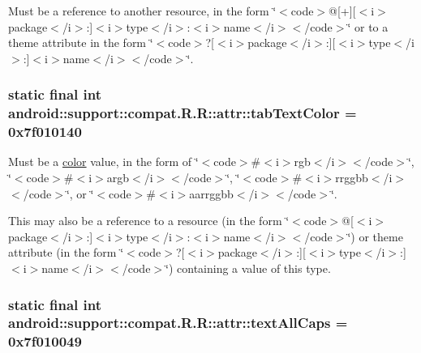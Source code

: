 Must be a reference to another resource, in the form \char`\"{}$<$code$>$@\mbox{[}+\mbox{]}\mbox{[}$<$i$>$package$<$/i$>$:\mbox{]}$<$i$>$type$<$/i$>$:$<$i$>$name$<$/i$>$$<$/code$>$\char`\"{} or to a theme attribute in the form \char`\"{}$<$code$>$?\mbox{[}$<$i$>$package$<$/i$>$:\mbox{]}\mbox{[}$<$i$>$type$<$/i$>$:\mbox{]}$<$i$>$name$<$/i$>$$<$/code$>$\char`\"{}. \hypertarget{classandroid_1_1support_1_1compat_1_1_r_1_1attr_183ac170e8f92fec45990e2cc7842bca}{
\subsubsection[{tabTextColor}]{\setlength{\rightskip}{0pt plus 5cm}static final int android::support::compat.R.R::attr::tabTextColor = 0x7f010140}}
\label{classandroid_1_1support_1_1compat_1_1_r_1_1attr_183ac170e8f92fec45990e2cc7842bca}


Must be a \hyperlink{classandroid_1_1support_1_1compat_1_1_r_1_1color}{color} value, in the form of \char`\"{}$<$code$>$\#$<$i$>$rgb$<$/i$>$$<$/code$>$\char`\"{}, \char`\"{}$<$code$>$\#$<$i$>$argb$<$/i$>$$<$/code$>$\char`\"{}, \char`\"{}$<$code$>$\#$<$i$>$rrggbb$<$/i$>$$<$/code$>$\char`\"{}, or \char`\"{}$<$code$>$\#$<$i$>$aarrggbb$<$/i$>$$<$/code$>$\char`\"{}. 

This may also be a reference to a resource (in the form \char`\"{}$<$code$>$@\mbox{[}$<$i$>$package$<$/i$>$:\mbox{]}$<$i$>$type$<$/i$>$:$<$i$>$name$<$/i$>$$<$/code$>$\char`\"{}) or theme attribute (in the form \char`\"{}$<$code$>$?\mbox{[}$<$i$>$package$<$/i$>$:\mbox{]}\mbox{[}$<$i$>$type$<$/i$>$:\mbox{]}$<$i$>$name$<$/i$>$$<$/code$>$\char`\"{}) containing a value of this type. \hypertarget{classandroid_1_1support_1_1compat_1_1_r_1_1attr_c655ce9291a05a9671c66d4279c1db8d}{
\subsubsection[{textAllCaps}]{\setlength{\rightskip}{0pt plus 5cm}static final int android::support::compat.R.R::attr::textAllCaps = 0x7f010049}}
\label{classandroid_1_1support_1_1compat_1_1_r_1_1attr_c655ce9291a05a9671c66d4279c1db8d}


